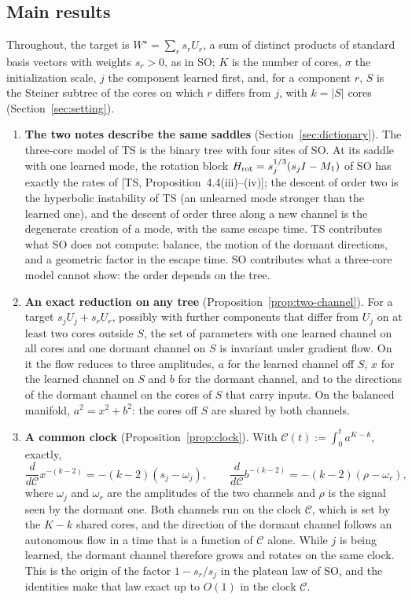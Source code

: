 \documentclass[11pt]{article}
\newcommand{\TS}{\textsf{TS}}
\newcommand{\SO}{\textsf{SO}}
\newcommand{\ts}[1]{[\TS, #1]}
\newcommand{\Clk}{\mathcal{C}}
\theoremstyle{definition}
\numberwithin{equation}{section}
\begin{document}
\subsection{Main results}\label{sec:results}

Throughout, the target is $W^\star=\sum_rs_rU_r$, a sum of distinct products of standard basis vectors with weights $s_r>0$, as in \SO; $K$ is the number of cores, $\sigma$ the initialization scale, $j$ the component learned first, and, for a component $r$, $S$ is the Steiner subtree of the cores on which $r$ differs from $j$, with $k=|S|$ cores (Section~\ref{sec:setting}).

\begin{enumerate}[label=\textbf{R\arabic*.},leftmargin=*,itemsep=3pt]
\item \textbf{The two notes describe the same saddles} (Section~\ref{sec:dictionary}). The three-core model of \TS{} is the binary tree with four sites of \SO. At its saddle with one learned mode, the rotation block $H_{\rm rot}=s_j^{1/3}(s_jI-M_1)$ of \SO{} has exactly the rates of \ts{Proposition~4.4(iii)--(iv)}; the descent of order two is the hyperbolic instability of \TS{} (an unlearned mode stronger than the learned one), and the descent of order three along a new channel is the degenerate creation of a mode, with the same escape time. \TS{} contributes what \SO{} does not compute: balance, the motion of the dormant directions, and a geometric factor in the escape time. \SO{} contributes what a three-core model cannot show: the order depends on the tree.

\item \textbf{An exact reduction on any tree} (Proposition~\ref{prop:two-channel}). For a target $s_jU_j+s_rU_r$, possibly with further components that differ from $U_j$ on at least two cores outside $S$, the set of parameters with one learned channel on all cores and one dormant channel on $S$ is invariant under gradient flow. On it the flow reduces to three amplitudes, $a$ for the learned channel off $S$, $x$ for the learned channel on $S$ and $b$ for the dormant channel, and to the directions of the dormant channel on the cores of $S$ that carry inputs. On the balanced manifold, $a^2=x^2+b^2$: the cores off $S$ are shared by both channels.

\item \textbf{A common clock} (Proposition~\ref{prop:clock}). With $\Clk(t):=\int_0^ta^{K-k}$, exactly,
\[
\frac{d}{d\Clk}x^{-(k-2)}=-(k-2)(s_j-\omega_j),\qquad\frac{d}{d\Clk}b^{-(k-2)}=-(k-2)(\rho-\omega_r),
\]
where $\omega_j$ and $\omega_r$ are the amplitudes of the two channels and $\rho$ is the signal seen by the dormant one. Both channels run on the clock $\Clk$, which is set by the $K-k$ shared cores, and the direction of the dormant channel follows an autonomous flow in a time that is a function of $\Clk$ alone. While $j$ is being learned, the dormant channel therefore grows and rotates on the same clock. This is the origin of the factor $1-s_r/s_j$ in the plateau law of \SO, and the identities make that law exact up to $O(1)$ in the clock $\Clk$.


\end{enumerate}
\end{document}
